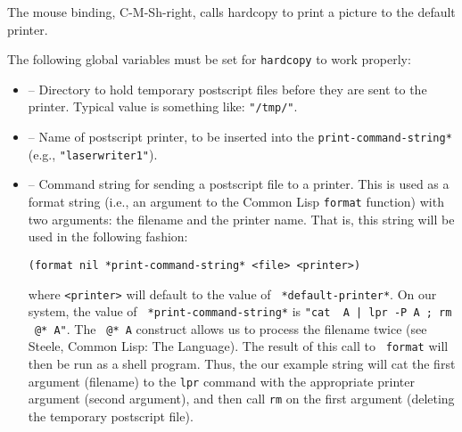The mouse binding, C-M-Sh-right, calls hardcopy to print a picture to
the default printer.

The following global variables must be set for {\tt hardcopy} to work
properly:
\begin{itemize}
\item {} -- Directory to hold temporary
postscript files before they are sent to the printer.  Typical value
is something like: {\tt "/tmp/"}.

\item {} -- Name of postscript printer, to be
inserted into the {\tt *print-command-string*} (e.g., {\tt "laserwriter1"}).

\item {} -- Command string for
sending a postscript file to a printer.  This is used as a format
string (i.e., an argument to the Common Lisp {\tt format} function)
with two arguments: the filename and the printer name.  That is, this
string will be used in the following fashion:
\begin{verbatim}
(format nil *print-command-string* <file> <printer>)
\end{verbatim}
where {\tt <printer>} will default to the value of {\tt
*default-printer*}.  On our system, the value of {\tt
*print-command-string*} is {\tt "cat ~A | lpr -P~A ; rm ~@*~A"}.  The
{\tt ~@*~A} construct allows us to process the filename twice (see
Steele, Common Lisp: The Language).  The result of this call to {\tt
format} will then be run as a shell program.  Thus, the our example
string will cat the first argument (filename) to the {\tt lpr} command
with the appropriate printer argument (second argument), and then call
{\tt rm} on the first argument (deleting the temporary postscript
file).
\end{itemize}

